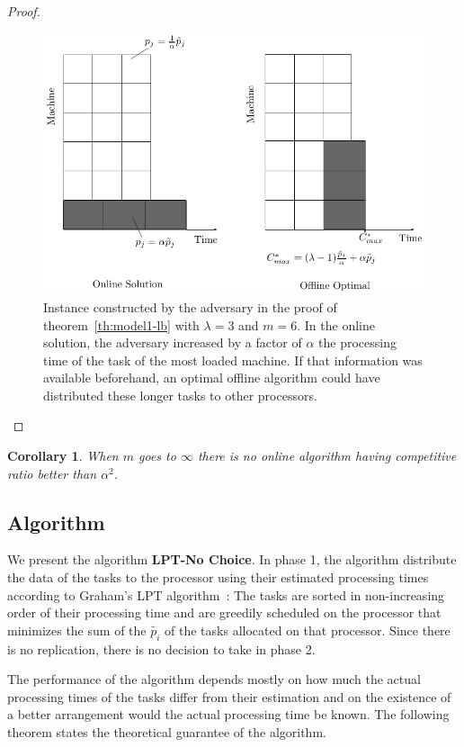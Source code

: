 \documentclass[10pt, conference, compsocconf]{IEEEtran}
\newtheorem{corollary}{Corollary}[theorem]
\begin{document}
\begin{proof}
  \begin{figure}[htp]
  \centering
  \includegraphics[width= 8 cm]{model1.pdf}
  \caption{Instance constructed by the adversary in the proof of
    theorem~\ref{th:model1-lb} with $\lambda = 3$ and $m = 6$. In the
    online solution, the adversary increased by a factor of $\alpha$
    the processing time of the task of the most loaded machine. If
    that information was available beforehand, an optimal offline
    algorithm could have distributed these longer tasks to other
    processors.}
  \label{fig:rara}
  \end{figure}
\end{proof}    
  
  
  \begin{corollary}
  When $m$ goes to $\infty$ there is no online algorithm having competitive ratio better than $\alpha^{2}$.
  \end{corollary}
  
\subsection{Algorithm}

We present the algorithm \textbf{LPT-No Choice}. In phase 1, the
algorithm distribute the data of the tasks to the processor using
their estimated processing times according to Graham's LPT
algorithm~\cite{Graham69boundson}: The tasks are sorted in non-increasing
order of their processing time and are greedily scheduled on the
processor that minimizes the sum of the $\tilde{p_i}$ of the tasks
allocated on that processor. Since there is no replication, there is
no decision to take in phase 2.

The performance of the algorithm depends mostly on how much the actual
processing times of the tasks differ from their estimation and on the
existence of a better arrangement would the actual processing time be
known. The following theorem states the theoretical guarantee of the
algorithm.
\end{document}
